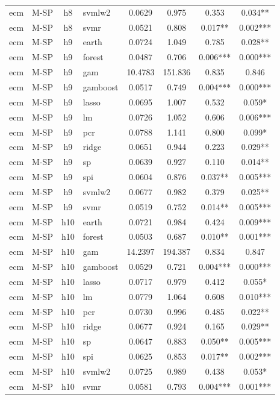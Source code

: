 \begin{ThreePartTable}
\begin{longtable}[t]{llclcccc}
ecm & M-SP & h8 & svmlw2 & 0.0629 & 0.975 & 0.353 & 0.034**\\
ecm & M-SP & h8 & svmr & 0.0521 & 0.808 & 0.017** & 0.002***\\
\addlinespace
ecm & M-SP & h9 & earth & 0.0724 & 1.049 & 0.785 & 0.028**\\
ecm & M-SP & h9 & forest & 0.0487 & 0.706 & 0.006*** & 0.000***\\
ecm & M-SP & h9 & gam & 10.4783 & 151.836 & 0.835 & 0.846\\
ecm & M-SP & h9 & gamboost & 0.0517 & 0.749 & 0.004*** & 0.000***\\
ecm & M-SP & h9 & lasso & 0.0695 & 1.007 & 0.532 & 0.059*\\
ecm & M-SP & h9 & lm & 0.0726 & 1.052 & 0.606 & 0.006***\\
ecm & M-SP & h9 & pcr & 0.0788 & 1.141 & 0.800 & 0.099*\\
ecm & M-SP & h9 & ridge & 0.0651 & 0.944 & 0.223 & 0.029**\\
ecm & M-SP & h9 & sp & 0.0639 & 0.927 & 0.110 & 0.014**\\
ecm & M-SP & h9 & spi & 0.0604 & 0.876 & 0.037** & 0.005***\\
ecm & M-SP & h9 & svmlw2 & 0.0677 & 0.982 & 0.379 & 0.025**\\
ecm & M-SP & h9 & svmr & 0.0519 & 0.752 & 0.014** & 0.005***\\
\addlinespace
ecm & M-SP & h10 & earth & 0.0721 & 0.984 & 0.424 & 0.009***\\
ecm & M-SP & h10 & forest & 0.0503 & 0.687 & 0.010** & 0.001***\\
ecm & M-SP & h10 & gam & 14.2397 & 194.387 & 0.834 & 0.847\\
ecm & M-SP & h10 & gamboost & 0.0529 & 0.721 & 0.004*** & 0.000***\\
ecm & M-SP & h10 & lasso & 0.0717 & 0.979 & 0.412 & 0.055*\\
ecm & M-SP & h10 & lm & 0.0779 & 1.064 & 0.608 & 0.010***\\
ecm & M-SP & h10 & pcr & 0.0730 & 0.996 & 0.485 & 0.022**\\
ecm & M-SP & h10 & ridge & 0.0677 & 0.924 & 0.165 & 0.029**\\
ecm & M-SP & h10 & sp & 0.0647 & 0.883 & 0.050** & 0.005***\\
ecm & M-SP & h10 & spi & 0.0625 & 0.853 & 0.017** & 0.002***\\
ecm & M-SP & h10 & svmlw2 & 0.0725 & 0.989 & 0.438 & 0.053*\\
ecm & M-SP & h10 & svmr & 0.0581 & 0.793 & 0.004*** & 0.001***\\

\end{longtable}
\end{ThreePartTable}
